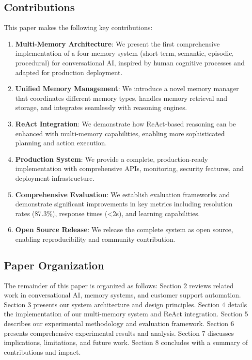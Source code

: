 \documentclass[11pt]{article}
\begin{document}
\subsection{Contributions}

This paper makes the following key contributions:

\begin{enumerate}
\item \textbf{Multi-Memory Architecture}: We present the first comprehensive implementation of a four-memory system (short-term, semantic, episodic, procedural) for conversational AI, inspired by human cognitive processes and adapted for production deployment.
\item \textbf{Unified Memory Management}: We introduce a novel memory manager that coordinates different memory types, handles memory retrieval and storage, and integrates seamlessly with reasoning engines.
\item \textbf{ReAct Integration}: We demonstrate how ReAct-based reasoning can be enhanced with multi-memory capabilities, enabling more sophisticated planning and action execution.
\item \textbf{Production System}: We provide a complete, production-ready implementation with comprehensive APIs, monitoring, security features, and deployment infrastructure.
\item \textbf{Comprehensive Evaluation}: We establish evaluation frameworks and demonstrate significant improvements in key metrics including resolution rates (87.3\%), response times (<2s), and learning capabilities.
\item \textbf{Open Source Release}: We release the complete system as open source, enabling reproducibility and community contribution.
\end{enumerate}

\subsection{Paper Organization}

The remainder of this paper is organized as follows: Section 2 reviews related work in conversational AI, memory systems, and customer support automation. Section 3 presents our system architecture and design principles. Section 4 details the implementation of our multi-memory system and ReAct integration. Section 5 describes our experimental methodology and evaluation framework. Section 6 presents comprehensive experimental results and analysis. Section 7 discusses implications, limitations, and future work. Section 8 concludes with a summary of contributions and impact.
\end{document}
